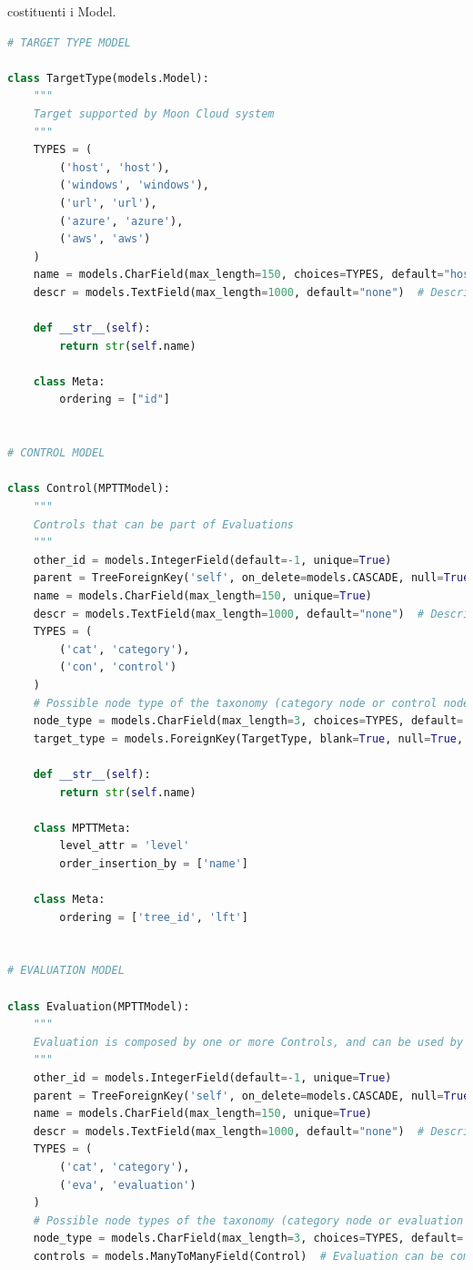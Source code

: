 costituenti i Model.
%
\lstset{style=python_code_style}
\begin{lstlisting}[language=Python, label=lst:model, caption={Parti principali del codice dei Models della soluzione.}]
# TARGET TYPE MODEL

class TargetType(models.Model):
    """
    Target supported by Moon Cloud system
    """
    TYPES = (
        ('host', 'host'),
        ('windows', 'windows'),
        ('url', 'url'),
        ('azure', 'azure'),
        ('aws', 'aws')
    )
    name = models.CharField(max_length=150, choices=TYPES, default="host")
    descr = models.TextField(max_length=1000, default="none")  # Description of a target

    def __str__(self):
        return str(self.name)

    class Meta:
        ordering = ["id"]


# CONTROL MODEL

class Control(MPTTModel):
    """
    Controls that can be part of Evaluations
    """
    other_id = models.IntegerField(default=-1, unique=True)
    parent = TreeForeignKey('self', on_delete=models.CASCADE, null=True, blank=True, related_name='children')
    name = models.CharField(max_length=150, unique=True)
    descr = models.TextField(max_length=1000, default="none")  # Description of a node in the taxonomy
    TYPES = (
        ('cat', 'category'),
        ('con', 'control')
    )
    # Possible node type of the taxonomy (category node or control node)
    node_type = models.CharField(max_length=3, choices=TYPES, default='cat')
    target_type = models.ForeignKey(TargetType, blank=True, null=True, on_delete=models.CASCADE)  # It's null for the root node and category nodes

    def __str__(self):
        return str(self.name)

    class MPTTMeta:
        level_attr = 'level'
        order_insertion_by = ['name']

    class Meta:
        ordering = ['tree_id', 'lft']


# EVALUATION MODEL

class Evaluation(MPTTModel):
    """
    Evaluation is composed by one or more Controls, and can be used by Users
    """
    other_id = models.IntegerField(default=-1, unique=True)
    parent = TreeForeignKey('self', on_delete=models.CASCADE, null=True, blank=True, related_name='children')
    name = models.CharField(max_length=150, unique=True)
    descr = models.TextField(max_length=1000, default="none")  # Description of a node in the taxonomy
    TYPES = (
        ('cat', 'category'),
        ('eva', 'evaluation')
    )
    # Possible node types of the taxonomy (category node or evaluation node)
    node_type = models.CharField(max_length=3, choices=TYPES, default='cat')
    controls = models.ManyToManyField(Control)  # Evaluation can be composed of one or more controls


\end{lstlisting}
